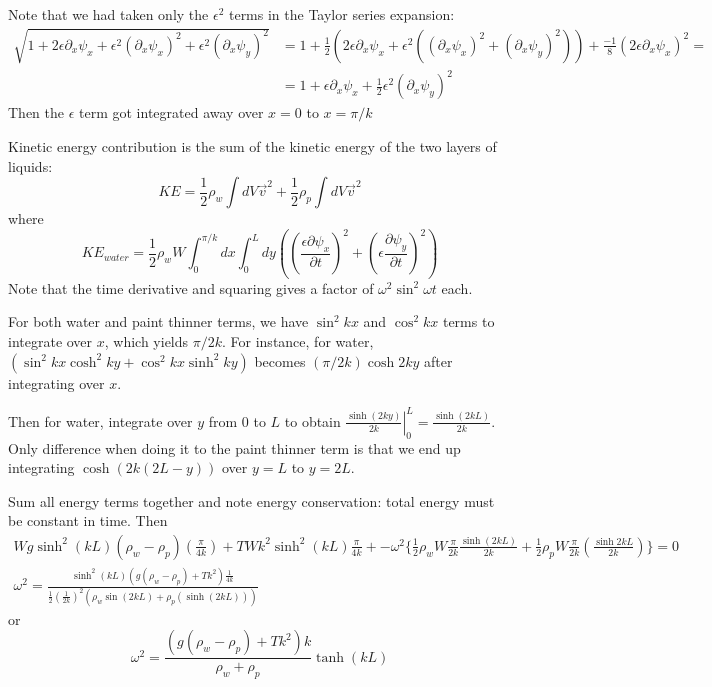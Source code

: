 \documentclass[twoside,10pt]{amsart}
\begin{document}
Note that we had taken only the $\epsilon^2$ terms in the Taylor series expansion:
\[
\begin{aligned}
  \sqrt{ 1 + 2 \epsilon \partial_x \psi_x + \epsilon^2(\partial_x \psi_x)^2 + \epsilon^2 (\partial_x \psi_y)^2 } & = 1 + \frac{1}{2} (2 \epsilon \partial_x \psi_x  + \epsilon^2 ((\partial_x \psi_x)^2 + (\partial_x \psi_y)^2 ) ) + \frac{-1}{8} (2 \epsilon \partial_x \psi_x)^2 = \\
  & = 1 + \epsilon \partial_x \psi_x + \frac{1}{2} \epsilon^2 (\partial_x \psi_y)^2
\end{aligned}
\]
Then the $\epsilon$ term got integrated away over $x=0$ to $x=\pi/k$  

Kinetic energy contribution is the sum of the kinetic energy of the two layers of liquids:
\[
KE = \frac{1}{2} \rho_w \int dV \vec{v}^2 + \frac{1}{2} \rho_p \int dV \vec{v}^2
\]
where 
\[
KE_{water} = \frac{1}{2} \rho_w W \int_0^{\pi/k} dx \int_0^L dy \left( \left( \frac{ \epsilon \partial \psi_x}{\partial t} \right)^2 + \left( \epsilon \frac{ \partial \psi_y }{\partial t} \right)^2 \right)
\]
Note that the time derivative and squaring gives a factor of $\omega^2 \sin^2{ \omega t}$ each. 

For both water and paint thinner terms, we have $\sin^2{kx}$ and $\cos^2{kx}$ terms to integrate over $x$, which yields $\pi/2k$.  For instance, for water, $(\sin^2{kx}\cosh^2{ky} + \cos^2{kx} \sinh^2{ky})$ becomes $(\pi/2k) \cosh{2ky}$ after integrating over $x$.  

Then for water, integrate over $y$ from $0$ to $L$ to obtain $ \left. \frac{ \sinh{(2ky)} }{2k} \right|_0^L = \frac{ \sinh{ (2kL)}}{2k}$.  Only difference when doing it to the paint thinner term is that we end up integrating $\cosh{(2k(2L-y))}$ over $y=L$ to $y=2L$.  

Sum all energy terms together and note energy conservation: total energy must be constant in time.  Then
\[
\begin{gathered}
  Wg \sinh^2{(kL)}(\rho_w - \rho_p) \left( \frac{ \pi}{4k} \right) + TW k^2 \sinh^2{(kL)} \frac{\pi}{4k} + - \omega^2 \{ \frac{1}{2} \rho_w W \frac{\pi}{2k} \frac{ \sinh{(2kL)} }{2k} + \frac{1}{2} \rho_p W \frac{\pi}{2k} \left( \frac{ \sinh{2kL} }{2k} \right) \} =0 \\
  \omega^2 = \frac{ \sinh^2{(kL)} ( g (\rho_w - \rho_p) + Tk^2) \frac{1}{4k} }{ \frac{1}{2} \left( \frac{1}{2k} \right)^2 ( \rho_w \sin{(2kL)} + \rho_p (\sinh{(2kL) } ) ) } 
\end{gathered}
\]
or
\[
\omega^2 = \frac{ ( g( \rho_w - \rho_p) + Tk^2 )k }{ \rho_w + \rho_p } \tanh{(kL)} 
\]
\end{document}
